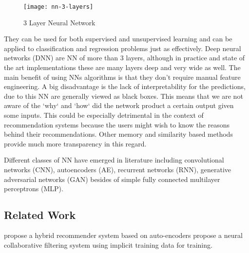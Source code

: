 \begin{figure}[h!]
    \texttt{[image: nn-3-layers]}
    \caption{3 Layer Neural Network}
\end{figure}

They can be used for both supervised and unsupervised learning and can be applied to classification and regression problems just as effectively. Deep neural networks (DNN) are NN of more than 3 layers, although in practice and state of the art implementations these are many layers deep and very wide as well. The main benefit of using NNs algorithms is that they don't require manual feature engineering.
A big disadvantage is the lack of interpretability for the predictions, due to this NN are generally viewed as black boxes. This means that we are not aware of the `why` and `how` did the network product a certain output given some inputs. This could be especially detrimental in the context of recommendation systems because the users might wish to know the reasons behind their recommendations. Other memory and similarity based methods provide much more transparency in this regard.

Different classes of NN have emerged in literature including convolutional networks (CNN), autoencoders (AE), recurrent networks (RNN), generative adversarial networks (GAN) besides of simple fully connected multilayer perceptrons (MLP).

\subsection{Related Work}
\citet{HybridAutoencoders} propose a hybrid recommender system based on auto-encoders
\citet{NeuralCF} propose a neural collaborative filtering system using implicit training data for training.
